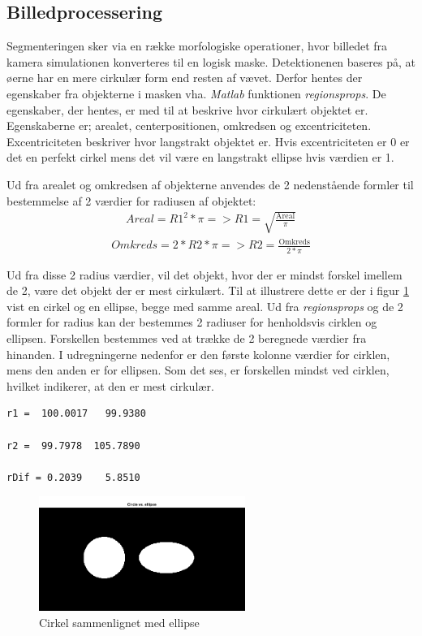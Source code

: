 \newpage
\subsection{Billedprocessering}
Segmenteringen sker via en række morfologiske operationer, hvor billedet fra kamera simulationen konverteres til en logisk maske. Detektionenen baseres på, at øerne har en mere cirkulær form end resten af vævet. Derfor hentes der egenskaber fra objekterne i masken vha. \textit{Matlab} funktionen \textit{regionsprops}. De egenskaber, der hentes, er med til at beskrive hvor cirkulært objektet er. Egenskaberne er; arealet, centerpositionen, omkredsen og excentriciteten. Excentriciteten beskriver hvor langstrakt objektet er. Hvis excentriciteten er 0 er det en perfekt cirkel mens det vil være en langstrakt ellipse hvis værdien er 1.

Ud fra arealet og omkredsen af objekterne anvendes de 2 nedenstående formler til bestemmelse af 2 værdier for radiusen af objektet:
\begin{align}
Areal = R1^2*\pi => R1 = \sqrt{\frac{\text{Areal}}{\pi}}
\end{align}
\begin{align}
Omkreds = 2*R2*\pi => R2 = \frac{\text{Omkreds}}{2*\pi}
\end{align}

Ud fra disse 2 radius værdier, vil det objekt, hvor der er mindst forskel imellem de 2, være det objekt der er mest cirkulært. Til at illustrere dette er der i figur \ref{fig:circleelip} vist en cirkel og en ellipse, begge med samme areal. Ud fra \textit{regionsprops} og de 2 formler for radius kan der bestemmes 2 radiuser for henholdsvis cirklen og ellipsen. Forskellen bestemmes ved at trække de 2 beregnede værdier fra hinanden. I udregningerne nedenfor er den første kolonne værdier for cirklen, mens den anden er for ellipsen. Som det ses, er forskellen mindst ved cirklen, hvilket indikerer, at den er mest cirkulær.
  
\begin{lstlisting} 
r1 =  100.0017   99.9380

r2 =  99.7978  105.7890

rDif = 0.2039    5.8510
\end{lstlisting} 

\begin{figure}[H]
	\centering
	\includegraphics[width=0.6\textwidth]{billeder/software/circleellipse.png}
	\caption{Cirkel sammenlignet med ellipse}
	\label{fig:circleelip}
\end{figure}

